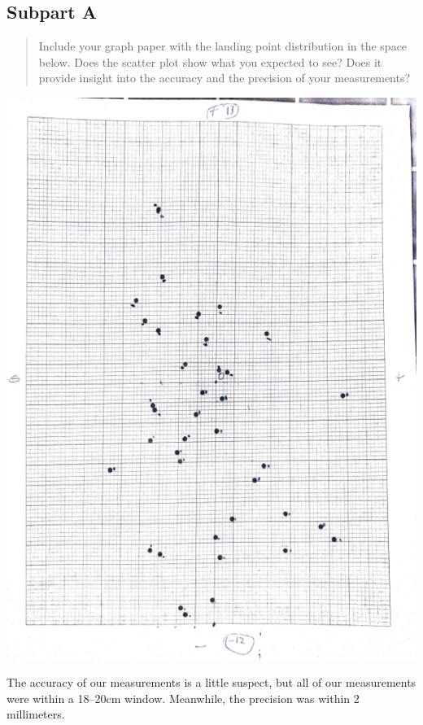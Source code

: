 \documentclass[8pt]{extarticle}
\begin{document}
{\subsection*{Subpart A}
\begin{quote}
	Include your graph paper with the landing point distribution in the space below.  Does the scatter plot show what you expected to see?  Does it provide insight into the accuracy and the precision of your measurements?
\end{quote}
\begin{center}
	\includegraphics[width=15cm]{Lab3Image4_1}
\end{center}
The accuracy of our measurements is a little suspect, but all of our measurements were within a 18–20cm window. Meanwhile, the precision was within 2 millimeters.
\pagebreak 
}
\end{document}
